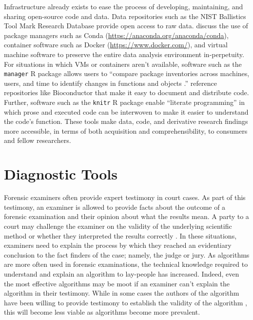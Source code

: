 \documentclass[11pt,]{isuthesis}
\begin{document}
Infrastructure already exists to ease the process of developing, maintaining, and sharing open-source code and data.
Data repositories such as the NIST Ballistics Tool Mark Research Database \citep{Zheng2020} provide open access to raw data.
\citet{Grning2018} discuss the use of package managers such as Conda (\url{https://anaconda.org/anaconda/conda}), container software such as Docker (\url{https://www.docker.com/}), and virtual machine software to preserve the entire data analysis environment in-perpetuity.
For situations in which VMs or containers aren't available, software such as the \texttt{manager} R package allows users to ``compare package inventories across machines, users, and time to identify changes in functions and objects \citep{Rice2020}.''
\citet{Piccolo2016} reference repositories like Bioconductor \citep{Huber2015} that make it easy to document and distribute code.
Further, software such as the \texttt{knitr} R package \citep{Xie2014} enable ``literate programming'' in which prose and executed code can be interwoven to make it easier to understand the code's function.
These tools make data, code, and derivative research findings more accessible, in terms of both acquisition and comprehensibility, to consumers and fellow researchers.

\hypertarget{diagnostic-tools}{%
\section{Diagnostic Tools}\label{diagnostic-tools}}

Forensic examiners often provide expert testimony in court cases.
As part of this testimony, an examiner is allowed to provide facts about the outcome of a forensic examination and their opinion about what the results mean.
A party to a court may challenge the examiner on the validity of the underlying scientific method or whether they interpreted the results correctly \citep{aafsArticle}.
In these situations, examiners need to explain the process by which they reached an evidentiary conclusion to the fact finders of the case; namely, the judge or jury.
As algorithms are more often used in forensic examinations, the technical knowledge required to understand and explain an algorithm to lay-people has increased.
Indeed, even the most effective algorithms may be moot if an examiner can't explain the algorithm in their testimony.
While in some cases the authors of the algorithm have been willing to provide testimony to establish the validity of the algorithm \citep{trueAlleleTestimony}, this will become less viable as algorithms become more prevalent.
\end{document}
